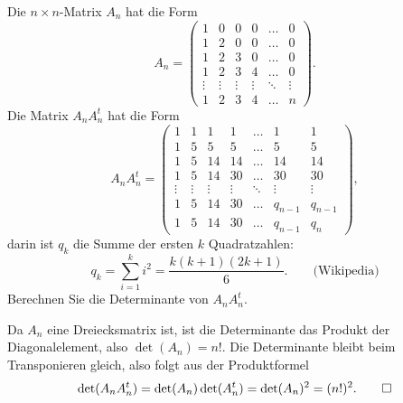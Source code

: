 Die $n\times n$-Matrix $A_n$ hat die Form
\[
A_n=\begin{pmatrix}
     1&     0&     0&     0&\dots &     0\\
     1&     2&     0&     0&\dots &     0\\
     1&     2&     3&     0&\dots &     0\\
     1&     2&     3&     4&\dots &     0\\
\vdots&\vdots&\vdots&\vdots&\ddots&\vdots\\
     1&     2&     3&     4&\dots &     n
\end{pmatrix}.
\]
Die Matrix $A_nA_n^t$ hat die Form
\[
A_nA_n^t
=
\begin{pmatrix}
     1&     1&     1&     1& \dots&      1&      1\\
     1&     5&     5&     5& \dots&      5&      5\\
     1&     5&    14&    14& \dots&     14&     14\\
     1&     5&    14&    30& \dots&     30&     30\\
\vdots&\vdots&\vdots&\vdots&\ddots& \vdots& \vdots\\
     1&     5&    14&    30& \dots&q_{n-1}&q_{n-1}\\
     1&     5&    14&    30& \dots&q_{n-1}&    q_n
\end{pmatrix},
\]
darin ist $q_k$ die Summe der ersten $k$ Quadratzahlen:
\[
q_k=\sum_{i=1}^ki^2=\frac{k(k+1)(2k+1)}6.
\qquad
\text{(Wikipedia)}
\]
Berechnen Sie die Determinante von $A_nA^t_n$.

\begin{loesung}
Da $A_n$ eine Dreiecksmatrix ist, ist die Determinante das Produkt der
Diagonalelement, also $\det(A_n)=n!$. 
Die Determinante bleibt beim Transponieren gleich, also folgt aus der
Produktformel
\[
\det(A_nA_n^t)=\det(A_n)\det(A_n^t)=\det(A_n)^2=(n!)^2.
\qedhere
\]
\end{loesung}


